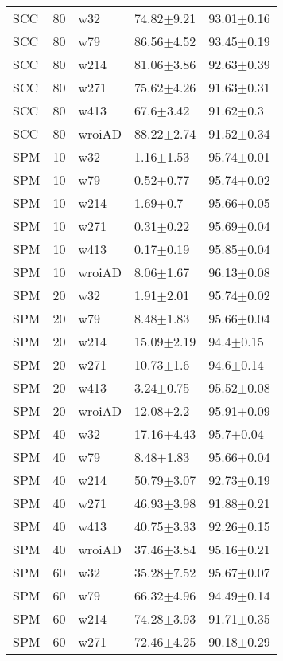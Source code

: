 \begin{table}[ht]
\begin{center}
\begin{tabular}{lllll}
  SCC & 80 & w32 & 74.82$\pm$9.21 & 93.01$\pm$0.16 \\ 
  SCC & 80 & w79 & 86.56$\pm$4.52 & 93.45$\pm$0.19 \\ 
  SCC & 80 & w214 & 81.06$\pm$3.86 & 92.63$\pm$0.39 \\ 
  SCC & 80 & w271 & 75.62$\pm$4.26 & 91.63$\pm$0.31 \\ 
  SCC & 80 & w413 & 67.6$\pm$3.42 & 91.62$\pm$0.3 \\ 
  SCC & 80 & wroiAD & 88.22$\pm$2.74 & 91.52$\pm$0.34 \\ 
  SPM & 10 & w32 & 1.16$\pm$1.53 & 95.74$\pm$0.01 \\ 
  SPM & 10 & w79 & 0.52$\pm$0.77 & 95.74$\pm$0.02 \\ 
  SPM & 10 & w214 & 1.69$\pm$0.7 & 95.66$\pm$0.05 \\ 
  SPM & 10 & w271 & 0.31$\pm$0.22 & 95.69$\pm$0.04 \\ 
  SPM & 10 & w413 & 0.17$\pm$0.19 & 95.85$\pm$0.04 \\ 
  SPM & 10 & wroiAD & 8.06$\pm$1.67 & 96.13$\pm$0.08 \\ 
  SPM & 20 & w32 & 1.91$\pm$2.01 & 95.74$\pm$0.02 \\ 
  SPM & 20 & w79 & 8.48$\pm$1.83 & 95.66$\pm$0.04 \\ 
  SPM & 20 & w214 & 15.09$\pm$2.19 & 94.4$\pm$0.15 \\ 
  SPM & 20 & w271 & 10.73$\pm$1.6 & 94.6$\pm$0.14 \\ 
  SPM & 20 & w413 & 3.24$\pm$0.75 & 95.52$\pm$0.08 \\ 
  SPM & 20 & wroiAD & 12.08$\pm$2.2 & 95.91$\pm$0.09 \\ 
  SPM & 40 & w32 & 17.16$\pm$4.43 & 95.7$\pm$0.04 \\ 
  SPM & 40 & w79 & 8.48$\pm$1.83 & 95.66$\pm$0.04 \\ 
  SPM & 40 & w214 & 50.79$\pm$3.07 & 92.73$\pm$0.19 \\ 
  SPM & 40 & w271 & 46.93$\pm$3.98 & 91.88$\pm$0.21 \\ 
  SPM & 40 & w413 & 40.75$\pm$3.33 & 92.26$\pm$0.15 \\ 
  SPM & 40 & wroiAD & 37.46$\pm$3.84 & 95.16$\pm$0.21 \\ 
  SPM & 60 & w32 & 35.28$\pm$7.52 & 95.67$\pm$0.07 \\ 
  SPM & 60 & w79 & 66.32$\pm$4.96 & 94.49$\pm$0.14 \\ 
  SPM & 60 & w214 & 74.28$\pm$3.93 & 91.71$\pm$0.35 \\ 
  SPM & 60 & w271 & 72.46$\pm$4.25 & 90.18$\pm$0.29 \\ 

\end{tabular}
\end{center}
\end{table}
